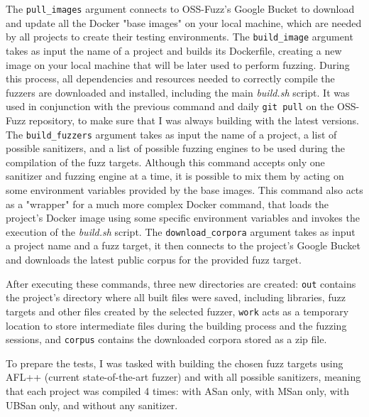 The \verb|pull_images| argument connects to OSS-Fuzz's Google Bucket to download and update all the Docker "base images" on your local machine, which are needed by all projects to create their testing environments.
The \verb|build_image| argument takes as input the name of a project and builds its Dockerfile, creating a new image on your local machine that will be later used to perform fuzzing. During this process, all dependencies and resources needed to correctly compile the fuzzers are downloaded and installed, including the main \textit{build.sh} script. It was used in conjunction with the previous command and daily \verb|git pull| on the OSS-Fuzz repository, to make sure that I was always building with the latest versions. 
The \verb|build_fuzzers| argument takes as input the name of a project, a list of possible sanitizers, and a list of possible fuzzing engines to be used during the compilation of the fuzz targets. Although this command accepts only one sanitizer and fuzzing engine at a time, it is possible to mix them by acting on some environment variables provided by the base images. This command also acts as a "wrapper" for a much more complex Docker command, that loads the project's Docker image using some specific environment variables and invokes the execution of the \textit{build.sh} script.
The \verb|download_corpora| argument takes as input a project name and a fuzz target, it then connects to the project's Google Bucket and downloads the latest public corpus for the provided fuzz target.

After executing these commands, three new directories are created: \verb|out| contains the project's directory where all built files were saved, including libraries, fuzz targets and other files created by the selected fuzzer, \verb|work| acts as a temporary location to store intermediate files during the building process and the fuzzing sessions, and \verb|corpus| contains the downloaded corpora stored as a zip file.

To prepare the tests, I was tasked with building the chosen fuzz targets using AFL++ (current state-of-the-art fuzzer) and with all possible sanitizers, meaning that each project was compiled 4 times: with ASan only, with MSan only, with UBSan only, and without any sanitizer.

